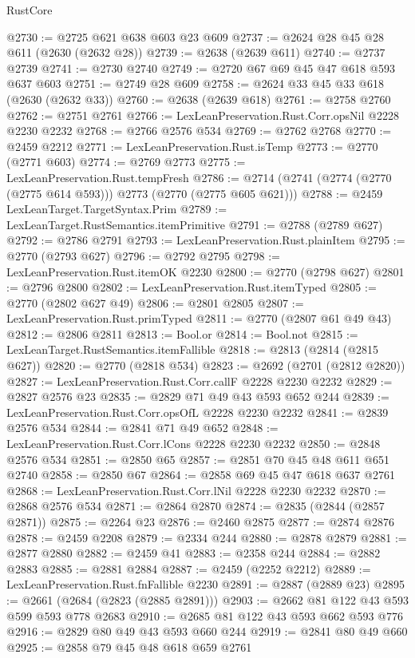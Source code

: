 \begin{lexlean}{RustCore}
\begin{coremodule}
@2730 := @2725 @621 @638 @603 @23 @609
@2737 := @2624 @28 @45 @28 @611 (@2630 (@2632 @28))
@2739 := @2638 (@2639 @611)
@2740 := @2737 @2739
@2741 := @2730 @2740
@2749 := @2720 @67 @69 @45 @47 @618 @593 @637 @603
@2751 := @2749 @28 @609
@2758 := @2624 @33 @45 @33 @618 (@2630 (@2632 @33))
@2760 := @2638 (@2639 @618)
@2761 := @2758 @2760
@2762 := @2751 @2761
@2766 := LexLeanPreservation.Rust.Corr.opsNil @2228 @2230 @2232
@2768 := @2766 @2576 @534
@2769 := @2762 @2768
@2770 := @2459 @2212
@2771 := LexLeanPreservation.Rust.isTemp
@2773 := @2770 (@2771 @603)
@2774 := @2769 @2773
@2775 := LexLeanPreservation.Rust.tempFresh
@2786 := @2714 (@2741 (@2774 (@2770 (@2775 @614 @593))) @2773 (@2770 (@2775 @605 @621)))
@2788 := @2459 LexLeanTarget.TargetSyntax.Prim
@2789 := LexLeanTarget.RustSemantics.itemPrimitive
@2791 := @2788 (@2789 @627)
@2792 := @2786 @2791
@2793 := LexLeanPreservation.Rust.plainItem
@2795 := @2770 (@2793 @627)
@2796 := @2792 @2795
@2798 := LexLeanPreservation.Rust.itemOK @2230
@2800 := @2770 (@2798 @627)
@2801 := @2796 @2800
@2802 := LexLeanPreservation.Rust.itemTyped
@2805 := @2770 (@2802 @627 @49)
@2806 := @2801 @2805
@2807 := LexLeanPreservation.Rust.primTyped
@2811 := @2770 (@2807 @61 @49 @43)
@2812 := @2806 @2811
@2813 := Bool.or
@2814 := Bool.not
@2815 := LexLeanTarget.RustSemantics.itemFallible
@2818 := @2813 (@2814 (@2815 @627))
@2820 := @2770 (@2818 @534)
@2823 := @2692 (@2701 (@2812 @2820))
@2827 := LexLeanPreservation.Rust.Corr.callF @2228 @2230 @2232
@2829 := @2827 @2576 @23
@2835 := @2829 @71 @49 @43 @593 @652 @244
@2839 := LexLeanPreservation.Rust.Corr.opsOfL @2228 @2230 @2232
@2841 := @2839 @2576 @534
@2844 := @2841 @71 @49 @652
@2848 := LexLeanPreservation.Rust.Corr.lCons @2228 @2230 @2232
@2850 := @2848 @2576 @534
@2851 := @2850 @65
@2857 := @2851 @70 @45 @48 @611 @651 @2740
@2858 := @2850 @67
@2864 := @2858 @69 @45 @47 @618 @637 @2761
@2868 := LexLeanPreservation.Rust.Corr.lNil @2228 @2230 @2232
@2870 := @2868 @2576 @534
@2871 := @2864 @2870
@2874 := @2835 (@2844 (@2857 @2871))
@2875 := @2264 @23
@2876 := @2460 @2875
@2877 := @2874 @2876
@2878 := @2459 @2208
@2879 := @2334 @244
@2880 := @2878 @2879
@2881 := @2877 @2880
@2882 := @2459 @41
@2883 := @2358 @244
@2884 := @2882 @2883
@2885 := @2881 @2884
@2887 := @2459 (@2252 @2212)
@2889 := LexLeanPreservation.Rust.fnFallible @2230
@2891 := @2887 (@2889 @23)
@2895 := @2661 (@2684 (@2823 (@2885 @2891)))
@2903 := @2662 @81 @122 @43 @593 @599 @593 @778 @2683
@2910 := @2685 @81 @122 @43 @593 @662 @593 @776
@2916 := @2829 @80 @49 @43 @593 @660 @244
@2919 := @2841 @80 @49 @660
@2925 := @2858 @79 @45 @48 @618 @659 @2761

\end{coremodule}
\end{lexlean}

